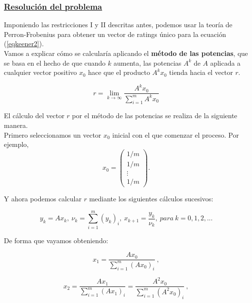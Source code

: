 \subsubsection*{\underline{Resolución del problema}}
Imponiendo las restricciones I y II descritas antes, podemos usar la teoría de Perron-Frobenius \cite[pág 36]{libro_rankings} \cite[Chapter 8]{perron} para obtener un vector de ratings único para la ecuación (\ref{eqkeener2}).\\

Vamos a explicar cómo se calcularía aplicando el \textbf{método de las potencias}, que se basa en el hecho de que cuando $k$ aumenta, las potencias $A^{k}$ de $A$ aplicada a cualquier vector positivo $x_{0}$ hace que el producto $A^{k} x_{0}$ tienda hacia el vector $r$.

\begin{equation}
r = \lim\limits_{k \rightarrow \infty}\dfrac{A^{k} x_{0}}{\sum_{i=1}^{m}A^{k} x_{0}} 
\end{equation}
 
El cálculo del vector $r$ por el método de las potencias se realiza de la siguiente manera.\\
Primero seleccionamos un vector $x_{0}$ inicial con el que comenzar el proceso. Por ejemplo,\\
\begin{equation*}
x_{0} = 
\left( \begin{array}{c}
1/m\\
1/m\\
\vdots\\
1/m
\end{array}\right).
\end{equation*}
 
Y ahora podemos calcular $r$ mediante los siguientes cálculos sucesivos:

\begin{equation}
y_{k}=Ax_{k}, \ \nu_{k}=\sum_{i=1}^{m}(y_{k})_{i}, \ x_{k+1}=\dfrac{y_{k}}{\nu_{k}}, \ para \ k = 0,1,2,... \label{powerm}
\end{equation}
 
De forma que vayamos obteniendo:

\begin{equation*}
x_{1}=\dfrac{Ax_{0}}{\sum_{i=1}^{m}(Ax_{0})_{i}} \ ,
\end{equation*}

\begin{equation*}
x_{2}=\dfrac{Ax_{1}}{\sum_{i=1}^{m}(Ax_{1})_{i}} = \dfrac{A^{2}x_{0}}{\sum_{i=1}^{m}(A^{2}x_{0})_{i}} \ ,
\end{equation*}

